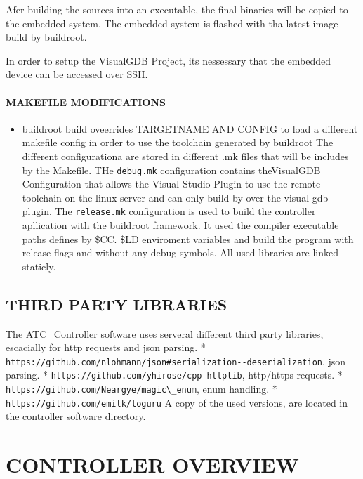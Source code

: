 \documentclass[
  english,
  paper=a4,
  ,captions=tableheading
]{scrartcl}
\newcommand{\passthrough}[1]{#1}
\providecommand{\tightlist}{%
  \setlength{\itemsep}{0pt}\setlength{\parskip}{0pt}}
\begin{document}
Afer building the sources into an executable, the final binaries will be
copied to the embedded system. The embedded system is flashed with tha
latest image build by buildroot.

In order to setup the VisualGDB Project, its nessessary that the
embedded device can be accessed over SSH.

\hypertarget{makefile-modifications}{%
\paragraph{MAKEFILE MODIFICATIONS}\label{makefile-modifications}}

\begin{itemize}
\tightlist
\item
  buildroot build oveerrides TARGETNAME AND CONFIG to load a different
  makefile config in order to use the toolchain generated by buildroot
  The different configurationa are stored in different .mk files that
  will be includes by the Makefile. THe
  \passthrough{\lstinline!debug.mk!} configuration contains theVisualGDB
  Configuration that allows the Visual Studio Plugin to use the remote
  toolchain on the linux server and can only build by over the visual
  gdb plugin. The \passthrough{\lstinline!release.mk!} configuration is
  used to build the controller apllication with the buildroot framework.
  It used the compiler executable paths defines by \$CC. \$LD enviroment
  variables and build the program with release flags and without any
  debug symbols. All used libraries are linked staticly.
\end{itemize}

\hypertarget{third-party-libraries}{%
\subsection{THIRD PARTY LIBRARIES}\label{third-party-libraries}}

The ATC\_Controller software uses serveral different third party
libraries, escacially for http requests and json parsing. *
\passthrough{\lstinline!https://github.com/nlohmann/json#serialization--deserialization!},
json parsing. *
\passthrough{\lstinline!https://github.com/yhirose/cpp-httplib!},
http/https requests. *
\passthrough{\lstinline!https://github.com/Neargye/magic\_enum!}, enum
handling. * \passthrough{\lstinline!https://github.com/emilk/loguru!} A
copy of the used versions, are located in the controller software
directory.

\hypertarget{controller-overview}{%
\section{CONTROLLER OVERVIEW}\label{controller-overview}}
\end{document}
